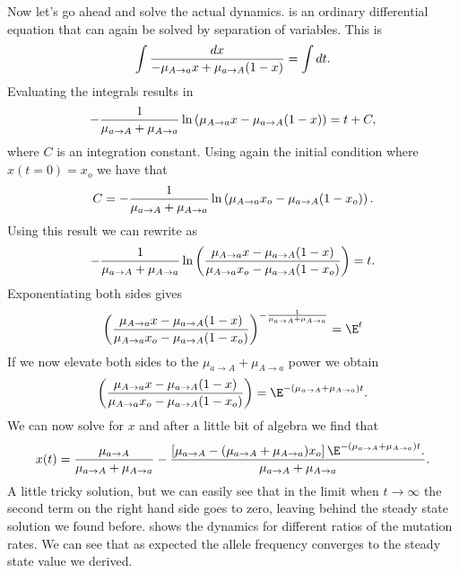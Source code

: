 Now let's go ahead and solve the actual dynamics.  is an
ordinary differential equation that can again be solved by separation of
variables. This is
\begin{equation}
  \int {dx \over - \mu_{A\rightarrow a} x + \mu_{a\rightarrow A} (1 - x)} = 
  \int dt.
\end{equation}
Evaluating the integrals results in
\begin{equation}
  -{1 \over \mu_{a\rightarrow A} + \mu_{A\rightarrow a}}
  \ln \left( \mu_{A\rightarrow a} x - \mu_{a\rightarrow A} (1 - x) \right) =
  t + C,
  \label{eq_mutation_int}
\end{equation}
where $C$ is an integration constant. Using again the initial condition where
$x(t=0) = x_o$ we have that
\begin{equation}
  C =  -{1 \over \mu_{a\rightarrow A} + \mu_{A\rightarrow a}}
  \ln \left( \mu_{A\rightarrow a} x_o - \mu_{a\rightarrow A} (1 - x_o) \right).
\end{equation}
Using this result we can rewrite  as
\begin{equation}
  -{1 \over \mu_{a\rightarrow A} + \mu_{A\rightarrow a}}
  \ln \left( { \mu_{A\rightarrow a} x - \mu_{a\rightarrow A} (1 - x)
    \over
  \mu_{A\rightarrow a} x_o - \mu_{a\rightarrow A} (1 - x_o)} \right) = t.
\end{equation}
Exponentiating both sides gives
\begin{equation}
  \left( { \mu_{A\rightarrow a} x - \mu_{a\rightarrow A} (1 - x)
    \over
  \mu_{A\rightarrow a} x_o - \mu_{a\rightarrow A} (1 - x_o)} \right)^{
    -{1 \over \mu_{a\rightarrow A} + \mu_{A\rightarrow a}}} = \E^t
\end{equation}
If we now elevate both sides to the $\mu_{a\rightarrow A} + \mu_{A\rightarrow
a}$ power we obtain
\begin{equation}
  \left( { \mu_{A\rightarrow a} x - \mu_{a\rightarrow A} (1 - x)
    \over
  \mu_{A\rightarrow a} x_o - \mu_{a\rightarrow A} (1 - x_o)} \right) =
  \E^{- (\mu_{a\rightarrow A} + \mu_{A\rightarrow a}) t}.
\end{equation}
We can now solve for $x$ and after a little bit of algebra we find that
\begin{equation}
  x(t) = {\mu_{a \rightarrow A} 
  \over 
  \mu_{a\rightarrow A} + \mu_{A\rightarrow a}} -
  {\left[  
  \mu_{a\rightarrow A} -
  (\mu_{a\rightarrow A} + \mu_{A\rightarrow a}) x_o
  \right] 
  \E^{- (\mu_{a\rightarrow A} + \mu_{A\rightarrow a}) t}.
  \over
  \mu_{a\rightarrow A} + \mu_{A\rightarrow a}}.
\end{equation}
A little tricky solution, but we can easily see that in the limit when $t
\rightarrow \infty$ the second term on the right hand side goes to zero,
leaving behind the steady state solution we found before. 
shows the dynamics for different ratios of the mutation rates. We can see that
as expected the allele frequency converges to the steady state value we
derived.

